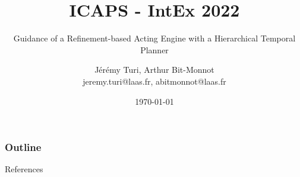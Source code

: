 \documentclass[handout, t, english]{beamer}
\title{ICAPS - IntEx 2022}
\subtitle{Guidance of a Refinement-based Acting Engine with a Hierarchical Temporal Planner}
\author{Jérémy Turi, Arthur Bit-Monnot \\
jeremy.turi@laas.fr, abitmonnot@laas.fr}
\institute{LAAS-CNRS}
\date{\today}
\begin{document}
\begin{frame}
\titlepage
\end{frame}

\begin{frame}
\frametitle{Outline}
\tableofcontents
\end{frame}


\begin{comment}
\begin{frame}{Goal of the presentation}
  The goal of the presentation is to present an agent with autonomous deliberation capabilities, able to make wise decisions thanks to look-ahead techniques.
\end{frame}
\end{comment}








\begin{frame}{References}
  
  
\end{frame}
\end{document}
